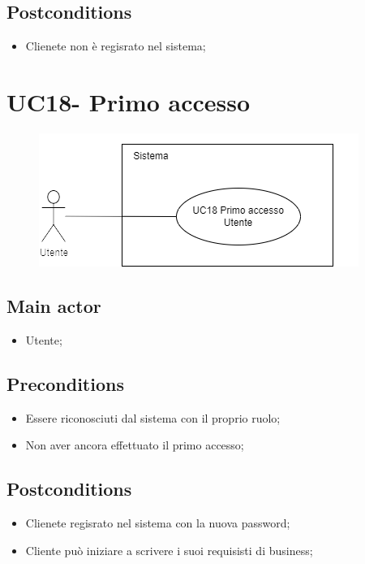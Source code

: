 \documentclass{article}
\begin{document}
    \subsection*{Postconditions}
        \begin{itemize}
            \item Clienete non è regisrato nel sistema;
        \end{itemize}
\section{UC18- Primo accesso}
 \begin{figure}[h]
          \centering
          \includegraphics{documenti/imgUML/UC18.png}
          \label{fig:immagine}
        \end{figure}
\subsection*{Main actor}
        \begin{itemize}
            \item Utente;
        \end{itemize}
        
    \subsection*{Preconditions}
        \begin{itemize}
            \item Essere riconosciuti dal sistema con il proprio ruolo;
            \item Non aver ancora effettuato il primo accesso;
        \end{itemize}
        
    \subsection*{Postconditions}
        \begin{itemize}
            \item Clienete regisrato nel sistema con la nuova password;
            \item Cliente può iniziare a scrivere i suoi requisisti di business;
        \end{itemize}
\end{document}
